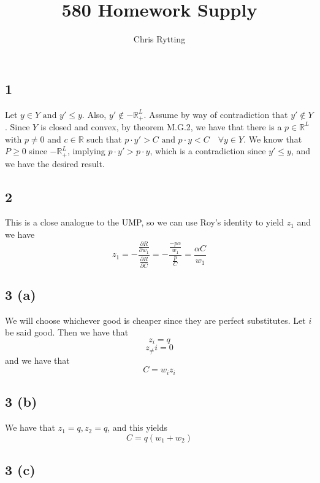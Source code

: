 \documentclass[letterpaper,12pt]{article}
\theoremstyle{definition}
\begin{document}
\title{580 Homework Supply}
\author{Chris Rytting}
\maketitle
\subsection*{1}
Let $y \in Y \text{ and } y'\leq y$. Also, $y' \not \in -\mathbb{R}_+^L$. Assume by way of contradiction that $y' \not \in Y$. Since $Y$ is closed and convex, by theorem M.G.2, we have that there is a $p \in \mathbb{R}^L$ with $p \neq 0$ and $c \in \mathbb{R}$ such that $p \cdot y' > C \text{ and } p \cdot y < C \quad \forall y \in Y$. We know that $P \geq 0$ since $-\mathbb{R}_+^L$, implying $p \cdot y' > p \cdot y$, which is a contradiction since $y' \leq y$, and we have the desired result.

\subsection*{2}

This is a close analogue to the UMP, so we can use Roy's identity to yield $z_1$ and we have
\[z_1 = - \frac{\frac{\partial R }{\partial w_1}}{\frac{\partial R} {\partial C}}= -\frac{\frac{-p \alpha}{w_1} }{\frac{p}{C}} = \frac{\alpha C}{w_1} \]

\subsection*{3 (a)}
We will choose whichever good is cheaper since they are perfect substitutes. Let $i$ be said good. Then we have that
\[z_i = q\]
\[z_\neq i = 0\]
and we have that
\[C = w_iz_i\]


\subsection*{3 (b)}

We have that $z_1 = q, z_2 = q$, and this yields 
\[C = q(w_1 + w_2) \]

\subsection*{3 (c)}
\end{document}
